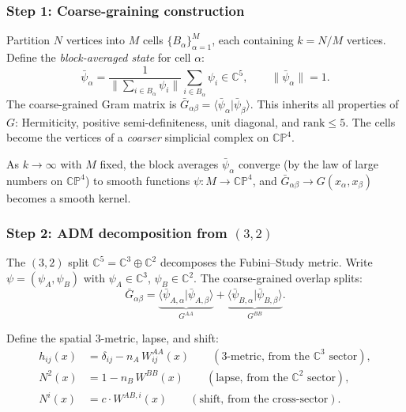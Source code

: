 \documentclass[12pt]{article}
\theoremstyle{remark}
\theoremstyle{definition}
\newcommand{\CC}{\mathbb{C}}
\begin{document}
\subsubsection{Step 1: Coarse-graining construction}

Partition $N$ vertices into $M$ cells $\{B_\alpha\}_{\alpha=1}^M$, each containing $k = N/M$ vertices.  Define the \emph{block-averaged state} for cell $\alpha$:
\begin{equation}
\bar{\psi}_\alpha = \frac{1}{\|\sum_{i \in B_\alpha}\psi_i\|}\sum_{i \in B_\alpha}\psi_i \in \CC^5, \qquad \|\bar{\psi}_\alpha\| = 1.
\end{equation}
The coarse-grained Gram matrix is $\bar{G}_{\alpha\beta} = \langle\bar{\psi}_\alpha|\bar{\psi}_\beta\rangle$.  This inherits all properties of $G$: Hermiticity, positive semi-definiteness, unit diagonal, and $\mathrm{rank} \le 5$.  The cells become the vertices of a \emph{coarser} simplicial complex on $\mathbb{CP}^4$.

As $k \to \infty$ with $M$ fixed, the block averages $\bar{\psi}_\alpha$ converge (by the law of large numbers on $\mathbb{CP}^4$) to smooth functions $\psi: M \to \mathbb{CP}^4$, and $\bar{G}_{\alpha\beta} \to G(x_\alpha, x_\beta)$ becomes a smooth kernel.

\subsubsection{Step 2: ADM decomposition from $(3,2)$}

The $(3,2)$ split $\CC^5 = \CC^3 \oplus \CC^2$ decomposes the Fubini--Study metric.  Write $\psi = (\psi_A, \psi_B)$ with $\psi_A \in \CC^3$, $\psi_B \in \CC^2$.  The coarse-grained overlap splits:
\begin{equation}
\bar{G}_{\alpha\beta} = \underbrace{\langle\bar{\psi}_{A,\alpha}|\bar{\psi}_{A,\beta}\rangle}_{G^{AA}} + \underbrace{\langle\bar{\psi}_{B,\alpha}|\bar{\psi}_{B,\beta}\rangle}_{G^{BB}}.
\end{equation}

Define the spatial 3-metric, lapse, and shift:
\begin{align}
h_{ij}(x) &= \delta_{ij} - n_A\,W^{AA}_{ij}(x) \qquad (3\text{-metric, from the }\CC^3\text{ sector}), \\
N^2(x) &= 1 - n_B\,W^{BB}(x) \qquad (\text{lapse, from the }\CC^2\text{ sector}), \\
N^i(x) &= c \cdot W^{AB,i}(x) \qquad (\text{shift, from the cross-sector}).
\end{align}
\end{document}
